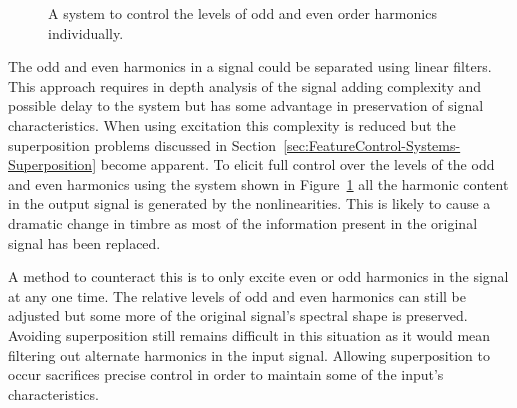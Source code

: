 \begin{figure}[h!]
			\caption{A system to control the levels of odd and even order harmonics individually.}
			\label{fig:HarmonicParitySystem}
		\end{figure}

		The odd and even harmonics in a signal could be separated using linear filters. This approach requires in
		depth analysis of the signal adding complexity and possible delay to the system but has some advantage in
		preservation of signal characteristics. When using excitation this complexity is reduced but the
		superposition problems discussed in Section~\ref{sec:FeatureControl-Systems-Superposition} become apparent.
		To elicit full control over the levels of the odd and even harmonics using the system shown in
		Figure~\ref{fig:HarmonicParitySystem} all the harmonic content in the output signal is generated by the
		nonlinearities. This is likely to cause a dramatic change in timbre as most of the information present in
		the original signal has been replaced. 

		A method to counteract this is to only excite even or odd harmonics in the signal at any one time.  The
		relative levels of odd and even harmonics can still be adjusted but some more of the original signal's
		spectral shape is preserved. Avoiding superposition still remains difficult in this situation as it would
		mean filtering out alternate harmonics in the input signal. Allowing superposition to occur sacrifices
		precise control in order to maintain some of the input's characteristics.


